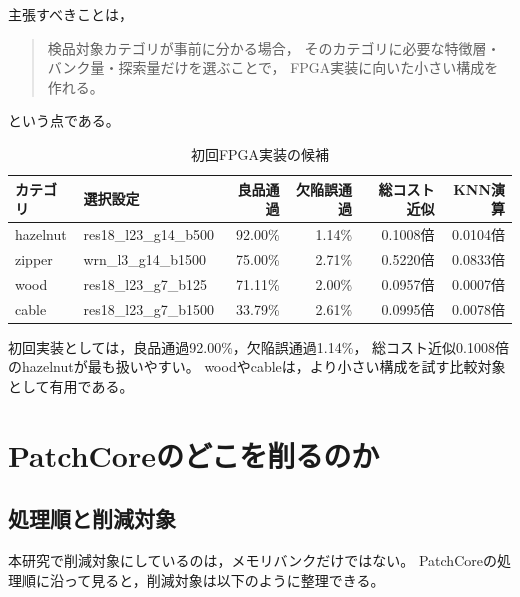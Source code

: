 \documentclass[uplatex,dvipdfmx,a4paper,11pt]{jsarticle}
\begin{document}
主張すべきことは，
\begin{quote}
検品対象カテゴリが事前に分かる場合，
そのカテゴリに必要な特徴層・バンク量・探索量だけを選ぶことで，
FPGA実装に向いた小さい構成を作れる。
\end{quote}
という点である。

\begin{table}[t]
  \centering
  \caption{初回FPGA実装の候補}
  \label{tab:first-targets}
  \begin{tabular}{llrrrr}
    \toprule
    カテゴリ & 選択設定 & 良品通過 & 欠陥誤通過 & 総コスト近似 & KNN演算 \\
    \midrule
    hazelnut & res18\_l23\_g14\_b500 & 92.00\% & 1.14\% & 0.1008倍 & 0.0104倍 \\
    zipper & wrn\_l3\_g14\_b1500 & 75.00\% & 2.71\% & 0.5220倍 & 0.0833倍 \\
    wood & res18\_l23\_g7\_b125 & 71.11\% & 2.00\% & 0.0957倍 & 0.0007倍 \\
    cable & res18\_l23\_g7\_b1500 & 33.79\% & 2.61\% & 0.0995倍 & 0.0078倍 \\
    \bottomrule
  \end{tabular}
\end{table}

初回実装としては，良品通過92.00\%，欠陥誤通過1.14\%，
総コスト近似0.1008倍のhazelnutが最も扱いやすい。
woodやcableは，より小さい構成を試す比較対象として有用である。

\section{PatchCoreのどこを削るのか}

\subsection{処理順と削減対象}

本研究で削減対象にしているのは，メモリバンクだけではない。
PatchCoreの処理順に沿って見ると，削減対象は以下のように整理できる。
\end{document}
